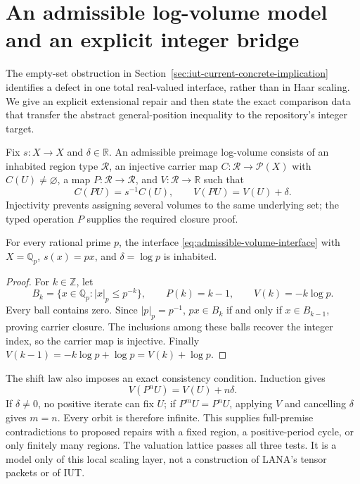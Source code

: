 \section{An admissible log-volume model and an explicit integer bridge}
\label{sec:iut-admissible-volume-integer-bridge}

The empty-set obstruction in
Section~\ref{sec:iut-current-concrete-implication} identifies a defect in one
total real-valued interface, rather than in Haar scaling.  We give an explicit
extensional repair and then state the exact comparison data that transfer the
abstract general-position inequality to the repository's integer target.

Fix $s:X\to X$ and $\delta\in\mathbb R$.  An admissible preimage log-volume
consists of an inhabited region type $\mathcal R$, an injective carrier map
$C:\mathcal R\to\mathcal P(X)$ with $C(U)\ne\varnothing$, a map
$P:\mathcal R\to\mathcal R$, and $V:\mathcal R\to\mathbb R$ such that
\begin{equation}\label{eq:admissible-volume-interface}
 C(PU)=s^{-1}C(U),\qquad V(PU)=V(U)+\delta.
\end{equation}
Injectivity prevents assigning several volumes to the same underlying set;
the typed operation $P$ supplies the required closure proof.

\begin{theorem}
\label{thm:padic-admissible-volume-model}
For every rational prime $p$, the interface
\eqref{eq:admissible-volume-interface} with $X=\mathbb Q_p$,
$s(x)=px$, and $\delta=\log p$ is inhabited.
\end{theorem}

\begin{proof}
For $k\in\mathbb Z$, let
\[
 B_k=\{x\in\mathbb Q_p:|x|_p\le p^{-k}\},\qquad
 P(k)=k-1,\qquad V(k)=-k\log p.
\]
Every ball contains zero.  Since $|p|_p=p^{-1}$,
$px\in B_k$ if and only if $x\in B_{k-1}$, proving carrier closure.
The inclusions among these balls recover the integer index, so the carrier
map is injective.  Finally
$V(k-1)=-k\log p+\log p=V(k)+\log p$.
\end{proof}

The shift law also imposes an exact consistency condition.  Induction gives
\begin{equation}\label{eq:admissible-volume-iterate}
                      V(P^nU)=V(U)+n\delta.
\end{equation}
If $\delta\ne0$, no positive iterate can fix $U$; if $P^mU=P^nU$, applying
$V$ and cancelling $\delta$ gives $m=n$.  Every orbit is therefore infinite.
This supplies full-premise contradictions to proposed repairs with a fixed
region, a positive-period cycle, or only finitely many regions.  The
valuation lattice passes all three tests.  It is a model only of this local
scaling layer, not a construction of LANA's tensor packets or of IUT.

